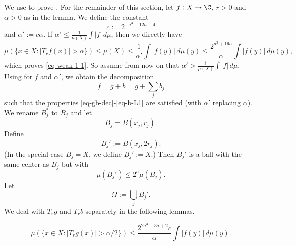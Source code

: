 We use  to prove . For the remainder of this section, let $f:X\to\C$, $r>0$ and $\alpha>0$ as in the lemma.
We define the constant
\begin{equation} \label{weak-1-1-proof-cz-const}
    c:= 2^{-a^3-12a-4}
\end{equation}
and $\alpha' := c\alpha$. If $\alpha'\le\frac{1}{\mu(X)}\int |f|\,d\mu$, then we directly have
\begin{equation*}
    \mu\left(\{x\in X: |T_r f(x)|>\alpha\}\right)\le \mu(X) \le \frac{1}{\alpha'} \int |f(y)|\, d\mu(y)
    \le \frac{2^{a^3 + 19a}}{\alpha} \int |f(y)|\, d\mu(y),
\end{equation*}
which proves \eqref{eq-weak-1-1}.
So assume from now on that $\alpha'>\frac{1}{\mu(X)}\int |f|\,d\mu$.
Using  for $f$ and $\alpha'$, we obtain the decomposition
\begin{equation*}
    f=g+b=g+\sum_j b_j
\end{equation*}
such that the properties \eqref{eq-gb-dec}-\eqref{eq-b-L1} are satisfied (with $\alpha'$ replacing $\alpha$). We rename $B_j^*$ to $B_j$ and let
\begin{equation}
    \label{eq-Ij-cj}
    B_j=B(x_j, r_j).
\end{equation}
Define
\begin{equation}
    \label{eq-Ij*}
    B_j':=B(x_j, 2r_j).
\end{equation}
(In the special case $B_j=X$, we define $B_j':=X$.)
Then $B_j'$ is a ball with the same center as $B_j$ but with
\begin{equation}
    \label{eq-Ij*-dim}
    \mu(B_j')\le 2^{a} \mu(B_j).
\end{equation}
Let
\begin{equation}
    \label{eq-omega}
    \Omega:=\bigcup_j B_j'.
\end{equation}
We deal with $T_rg$ and $T_rb$ separately in the following lemmas.

\begin{lemma}
    \label{estimate-good}
    \begin{equation*}
        \mu\left(\{x\in X: |T_r g(x)|>{\alpha}/2\}\right)
        \le \frac{2^{2a^3+3a+2}c}{\alpha} \int |f(y)|\, d\mu(y).
    \end{equation*}

\end{lemma}

